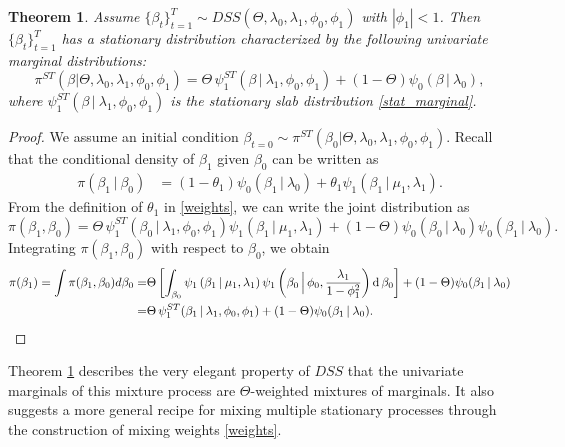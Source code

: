 \documentclass[ba]{imsart}
\numberwithin{equation}{section}
\theoremstyle{plain}
\def\d{\mbox{\boldmath$d$}}
\renewcommand{\d}{\mathrm{d}}
\def\C {\,|\:}
\def\C {\,|\:}
\renewcommand{\d}{\mathrm{d}\,}
\newtheorem{theorem}{Theorem}
\begin{document}
\begin{theorem}\label{thm1}
Assume $\{\beta_{t}\}_{t=1}^T\sim DSS(\Theta,\lambda_0,\lambda_1,\phi_0,\phi_1)$ with $|\phi_1|<1$. Then $\{\beta_{t}\}_{t=1}^T$ has a stationary distribution characterized by the following univariate marginal distributions:
\begin{equation}\label{stat_dist}
\pi^{ST}(\beta|\Theta,\lambda_0,\lambda_1,\phi_0,\phi_1)=\Theta\,\psi_1^{ST}(\beta\C \lambda_1,\phi_0,\phi_1)+(1-\Theta)\psi_0\left(\beta\C\lambda_0\right),
\end{equation}
where $\psi_1^{ST}(\beta\C \lambda_1,\phi_0,\phi_1)$ is the stationary slab distribution \eqref{stat_marginal}.
\end{theorem}
\begin{proof}
We assume an initial condition $\beta_{t=0}\sim \pi^{ST}(\beta_0|\Theta,\lambda_0,\lambda_1,\phi_0,\phi_1)$. Recall that the conditional density of $\beta_{1}$ given $\beta_{0}$ can be written as
\begin{align}
\pi(\beta_{1}\C\beta_0)&=(1-\theta_{1})\psi_0(\beta_{1}\C\lambda_0)+\theta_{1}\psi_1(\beta_{1}\C\mu_1,\lambda_1).
\end{align}
From the definition of  $\theta_1$ in \eqref{weights}, we can write the joint distribution  as
$$
\pi(\beta_1,\beta_0)=\Theta\,\psi^{ST}_1\left(\beta_0\C\lambda_1,\phi_0,\phi_1\right)\psi_1(\beta_1\C\mu_{1},\lambda_1)+{(1-\Theta)\psi_0\left(\beta_{0}\C\lambda_0\right)\psi_0(\beta_{1}\C\lambda_0)}.
$$
Integrating $\pi(\beta_1,\beta_0)$ with respect to $\beta_0$, we obtain
\begin{align*}
\pi(\beta_1)=\int \pi(\beta_1,\beta_0)d\beta_0=&\Theta \left[\int_{\beta_0}\psi_1\left(\beta_1\C\mu_{1},\lambda_1\right)\psi_1\left(\beta_{0}\,\Big|\, \phi_{0},\frac{\lambda_1}{1-\phi_{1}^2}\right)\d\beta_0\right]+(1-\Theta)\psi_0(\beta_1\C\lambda_0) \\
=&\Theta\, \psi^{ST}_1(\beta_1\C\lambda_1,\phi_0,\phi_1)+(1-\Theta)\psi_0(\beta_1\C\lambda_0).\quad\quad \qedhere
\end{align*}
\end{proof}
 Theorem \ref{thm1} describes the very elegant property of $DSS$ that the univariate marginals of this mixture process are  $\Theta$-weighted mixtures of marginals.
 It also suggests a more general recipe for mixing multiple stationary processes  through the construction of mixing weights \eqref{weights}. 
 
\end{document}
